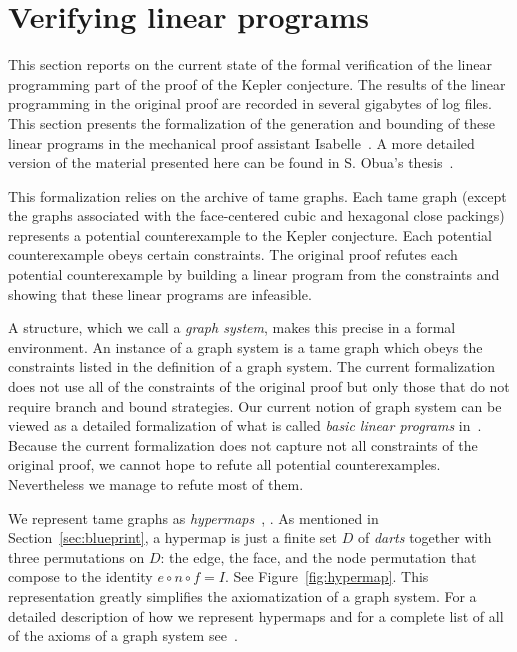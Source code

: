 \documentclass[11pt]{amsart}
\begin{document}
\section{Verifying linear programs}
\label{sec:lp}

This section reports on the current state of the formal verification of
the linear programming part of the proof of the Kepler conjecture.
The results of the linear programming in the original proof are recorded
in several gigabytes of log files.
This section presents the formalization of the generation and bounding of these linear programs 
in the mechanical proof assistant Isabelle~\cite{LNCS2283}. 
A more detailed version of the material presented here can be found in S. Obua's thesis~\cite{obua:phd}.

This formalization relies on the archive of tame graphs. Each tame graph (except the graphs associated with the face-centered cubic and hexagonal close packings) represents a potential counterexample to the Kepler conjecture. 
Each potential counterexample  obeys certain constraints.  The original
proof refutes each potential counterexample by building a linear program
from the constraints and showing that these linear programs are infeasible.

A structure, which we call a \emph{graph system}, makes this precise
in a formal environment.
An instance of a graph system is a tame graph which obeys the constraints listed in the definition of a graph system.
The current formalization does not use all of the constraints of the original proof but only those that do not require branch and bound strategies. Our current notion of graph system can be viewed
as a detailed formalization of what is called \emph{basic linear programs} in~\cite[\S 23.3]{Hales:2006:DCG}. 
Because the current formalization does not capture not all constraints of the original proof, we cannot hope to refute all potential counterexamples. Nevertheless we manage to refute most of them.

We represent tame graphs as \emph{hypermaps}~\cite{gonthier:2008:formal}, \cite{website:FlyspeckProject}. As mentioned in Section~\ref{sec:blueprint}, 
a hypermap is just a finite set $D$ of \emph{darts} together
with three permutations on $D$: the edge, the face, and the node permutation that compose to the identity $e\circ n\circ f = I$.   See Figure~\ref{fig:hypermap}.
This representation greatly simplifies
the axiomatization of a graph system. For a detailed description of how we represent 
hypermaps and for a complete list of all of the axioms of a graph system see~\cite[\S4]{obua:phd}.
\end{document}

